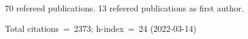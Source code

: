 70 refereed publications. 13 refeered publications as first author.

Total citations~=~2373; h-index~=~24 (2022-03-14)